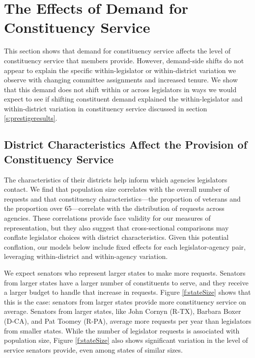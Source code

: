 \documentclass[12pt]{article}
\begin{document}
\section{The Effects of Demand for Constituency Service}\label{s:demand} 

This section shows that demand for constituency service affects the level of constituency service that members provide. However, demand-side shifts do not appear to explain the specific within-legislator or within-district variation we observe with changing committee assignments and increased tenure. %
We show that this demand does not shift within or across legislators in ways we would expect to see if shifting constituent demand explained the within-legislator and within-district variation in constituency service discussed in section \ref{s:prestigeresults}.

\subsection{District Characteristics Affect the Provision of Constituency Service}

The characteristics of their districts help inform which agencies legislators contact. We find that population size correlates with the overall number of requests and that constituency characteristics—the proportion of veterans and the proportion over 65—correlate with the distribution of requests across agencies. These correlations provide face validity for our measures of representation, but they also suggest that cross-sectional comparisons may conflate legislator choices with district characteristics. Given this potential conflation, our models below include fixed effects for each legislator-agency pair, leveraging within-district and within-agency variation.  

We expect senators who represent larger states to make more requests. Senators from larger states have a larger number of constituents to serve, and they receive a larger budget to handle that increase in requests.
Figure \ref{f:stateSize} shows that this is the case: senators from larger states provide more constituency service on average. Senators from larger states, like John Cornyn (R-TX), Barbara Boxer (D-CA), and Pat Toomey (R-PA), average more requests per year than legislators from smaller states. While the number of legislator requests is associated with population size, Figure \ref{f:stateSize} also shows significant variation in the level of service senators provide, even among states of similar sizes.  
\end{document}
